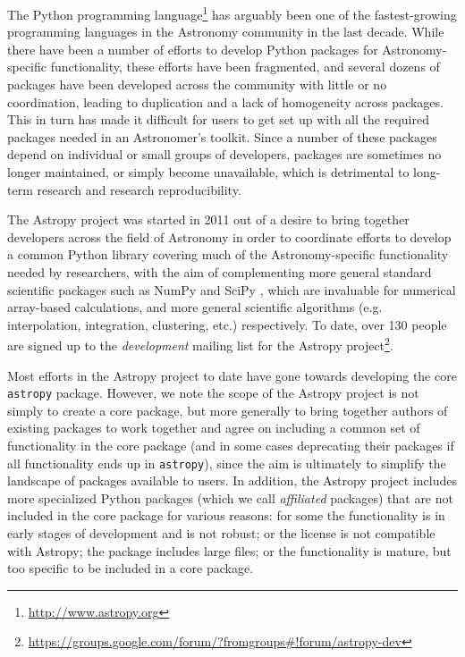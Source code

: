 \documentclass[12pt,preprint]{aastex}
\begin{document}

The Python programming language\footnote{\url{http://www.astropy.org}} has
arguably been one of the fastest-growing programming languages in the
Astronomy community in the last decade. While there have been a number of
efforts to develop Python packages for Astronomy-specific functionality, these
efforts have been fragmented, and several dozens of packages have been
developed across the community with little or no coordination, leading to
duplication and a lack of homogeneity across packages. This in turn has made
it difficult for users to get set up with all the required packages needed in
an Astronomer's toolkit. Since a number of these packages depend on individual
or small groups of developers, packages are sometimes no longer maintained, or
simply become unavailable, which is detrimental to long-term research and
research reproducibility.

The Astropy project was started in 2011 out of a desire to bring together
developers across the field of Astronomy in order to coordinate efforts to
develop a common Python library covering much of the Astronomy-specific
functionality needed by researchers, with the aim of complementing more
general standard scientific packages such as NumPy
\citep{oliphant2006guide,van2011numpy} and SciPy \citep{jones2001scipy}, which
are invaluable for numerical array-based calculations, and more general
scientific algorithms (e.g. interpolation, integration, clustering, etc.)
respectively. To date, over 130 people are signed up to the
\textit{development} mailing list for the Astropy project\footnote{
\url{https://groups.google.com/forum/?fromgroups\#!forum/astropy-dev}}.

Most efforts in the Astropy project to date have gone towards developing the
core \texttt{astropy} package. However, we note the scope of the Astropy
project is not simply to create a core package, but more generally to bring
together authors of existing packages to work together and agree on including
a common set of functionality in the core package (and in some cases
deprecating their packages if all functionality ends up in \texttt{astropy}),
since the aim is ultimately to simplify the landscape of packages available to
users. In addition, the Astropy project includes more specialized Python
packages (which we call \textit{affiliated} packages) that are not included in
the core package for various reasons: for some the functionality is in early
stages of development and is not robust; or the license is not compatible with
Astropy; the package includes large files; or the functionality is mature, but
too specific to be included in a core package.
\end{document}
